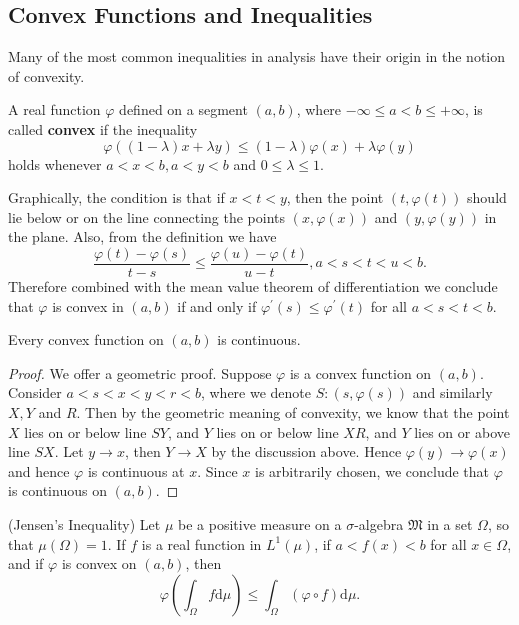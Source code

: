 \subsection{Convex Functions and Inequalities}
Many of the most common inequalities in analysis have their origin in the notion of convexity.
\begin{definition}
A real function $\varphi$ defined on a segment $(a,b)$, where $-\infty\le a<b\le+\infty$, is called \textbf{convex} if the inequality 
$$\varphi((1-\lambda)x+\lambda y)\le(1-\lambda)\varphi(x)+\lambda\varphi(y)$$
holds whenever $a<x<b,a<y<b$ and $0\le\lambda\le1$.
\end{definition}
Graphically, the condition is that if $x<t<y$, then the point $(t,\varphi(t))$ should lie below or on the line connecting the points $(x,\varphi(x))$ and $(y,\varphi(y))$ in the plane. Also, from the definition we have 
$$
\frac{\varphi \left( t \right) -\varphi \left( s \right)}{t-s}\le \frac{\varphi \left( u \right) -\varphi \left( t \right)}{u-t},a<s<t<u<b.
$$
Therefore combined with the mean value theorem of differentiation we conclude that $\varphi$ is convex in $(a,b)$ if and only if $\varphi^\prime(s)\le\varphi^\prime(t)$ for all $a<s<t<b$.
\begin{theorem}
Every convex function on $(a,b)$ is continuous.
\end{theorem}
\begin{proof}
We offer a geometric proof. Suppose $\varphi$ is a convex function on $(a,b)$. Consider $a<s<x<y<r<b$, where we denote $S:(s,\varphi(s))$ and similarly $X,Y$ and $R$. Then by the geometric meaning of convexity, we know that the point $X$ lies on or below line $SY$, and $Y$ lies on or below line $XR$, and $Y$ lies on or above line $SX$. Let $y\to x$, then $Y\to X$ by the discussion above. Hence $\varphi(y)\to\varphi(x)$ and hence $\varphi$ is continuous at $x$. Since $x$ is arbitrarily chosen, we conclude that $\varphi$ is continuous on $(a,b)$.
\end{proof}
\begin{theorem}(Jensen's Inequality)
Let $\mu$ be a positive measure on a $\sigma$-algebra $\mathfrak{M}$ in a set $\Omega$, so that $\mu(\Omega)=1$. If $f$ is a real function in $L^1(\mu)$, if $a<f(x)<b$ for all $x\in\Omega$, and if $\varphi$ is convex on $(a,b)$, then 
$$
\varphi \left( \int_{\Omega}{f\mathrm{d}\mu} \right) \le \int_{\Omega}{\left( \varphi \circ f \right) \mathrm{d}\mu}.
$$
\end{theorem}
